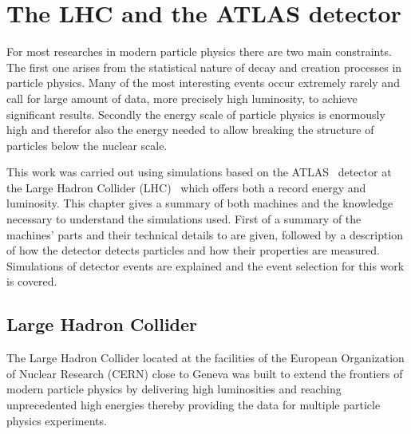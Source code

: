 

\chapter{The LHC and the ATLAS detector}
\label{lhc_atlas}


For most researches in modern particle physics there are two main constraints. The first one arises from the statistical nature of decay and creation processes in particle physics. Many of the most interesting events occur extremely rarely and call for large amount of data, more precisely high luminosity, to achieve significant results. Secondly the energy scale of particle physics is enormously high and therefor also the energy needed to allow breaking the structure of particles below the nuclear scale. 

This work was carried out using simulations based on the ATLAS~\cite{atlas} detector at the Large Hadron Collider (LHC)~\cite{lhc_machine} which offers both a record energy and luminosity. This chapter gives a summary of both machines and the knowledge necessary to understand the simulations used. First of a summary of the machines' parts and their technical details to are given, followed by a description of how the detector detects particles and how their properties are measured. Simulations of detector events are explained and the event selection for this work is covered.

\section{Large Hadron Collider}

The Large Hadron Collider located at the facilities of the European Organization of Nuclear Research (CERN) close to Geneva was built to extend the frontiers of modern particle physics by delivering high luminosities and reaching unprecedented high energies thereby providing the data for multiple particle physics experiments.

